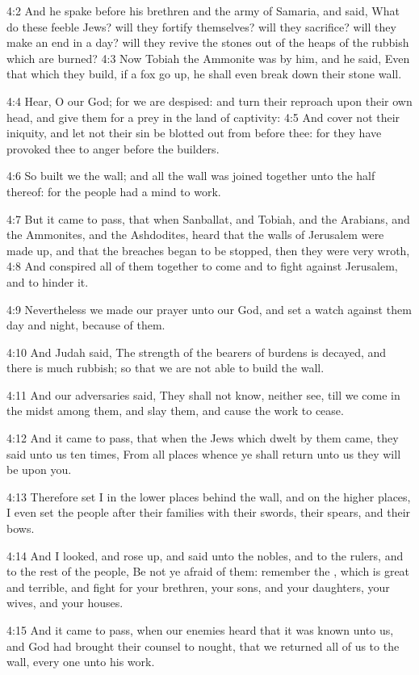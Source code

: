 4:2 And he spake before his brethren and the army of Samaria, and said, What do these feeble Jews? will they fortify themselves? will they sacrifice?  will they make an end in a day? will they revive the stones out of the heaps of the rubbish which are burned?  4:3 Now Tobiah the Ammonite was by him, and he said, Even that which they build, if a fox go up, he shall even break down their stone wall.

4:4 Hear, O our God; for we are despised: and turn their reproach upon their own head, and give them for a prey in the land of captivity: 4:5 And cover not their iniquity, and let not their sin be blotted out from before thee: for they have provoked thee to anger before the builders.

4:6 So built we the wall; and all the wall was joined together unto the half thereof: for the people had a mind to work.

4:7 But it came to pass, that when Sanballat, and Tobiah, and the Arabians, and the Ammonites, and the Ashdodites, heard that the walls of Jerusalem were made up, and that the breaches began to be stopped, then they were very wroth, 4:8 And conspired all of them together to come and to fight against Jerusalem, and to hinder it.

4:9 Nevertheless we made our prayer unto our God, and set a watch against them day and night, because of them.

4:10 And Judah said, The strength of the bearers of burdens is decayed, and there is much rubbish; so that we are not able to build the wall.

4:11 And our adversaries said, They shall not know, neither see, till we come in the midst among them, and slay them, and cause the work to cease.

4:12 And it came to pass, that when the Jews which dwelt by them came, they said unto us ten times, From all places whence ye shall return unto us they will be upon you.

4:13 Therefore set I in the lower places behind the wall, and on the higher places, I even set the people after their families with their swords, their spears, and their bows.

4:14 And I looked, and rose up, and said unto the nobles, and to the rulers, and to the rest of the people, Be not ye afraid of them: remember the \LORD, which is great and terrible, and fight for your brethren, your sons, and your daughters, your wives, and your houses.

4:15 And it came to pass, when our enemies heard that it was known unto us, and God had brought their counsel to nought, that we returned all of us to the wall, every one unto his work.

